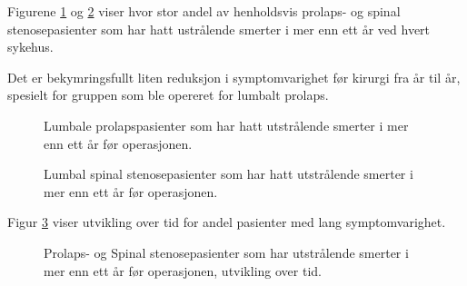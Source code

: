 \documentclass [norsk,a4paper,twoside]{article}\usepackage[]{graphicx}\usepackage[]{color}
\begin{document}
      
      

Figurene \ref{fig:VarighSmerteUtstrAvdPro} og \ref{fig:VarighSmerteUtstrAvdSS} viser hvor stor andel av henholdsvis prolaps- og spinal stenosepasienter som har hatt ustrålende smerter i mer enn ett år ved hvert sykehus.

Det er bekymringsfullt liten reduksjon i symptomvarighet før kirurgi fra år til år, spesielt for gruppen som ble opereret for lumbalt prolaps.



 


\begin{figure}[h] 
\caption{Lumbale prolapspasienter som har hatt utstrålende smerter i mer enn ett år før operasjonen.}
\label{fig:VarighSmerteUtstrAvdPro}
\end{figure}

\begin{figure}[h] 
\caption{Lumbal spinal stenosepasienter som har hatt utstrålende smerter i mer enn ett år før operasjonen.}
\label{fig:VarighSmerteUtstrAvdSS}
\end{figure}

Figur \ref{fig:VarighSmerteUtstrTid} viser utvikling over tid for andel pasienter med lang symptomvarighet. 

\begin{figure}[h] 
\caption{Prolaps- og Spinal stenosepasienter som har utstrålende smerter i mer enn ett år før operasjonen, utvikling over tid.}
\label{fig:VarighSmerteUtstrTid}
\end{figure}




									
\end{document}

